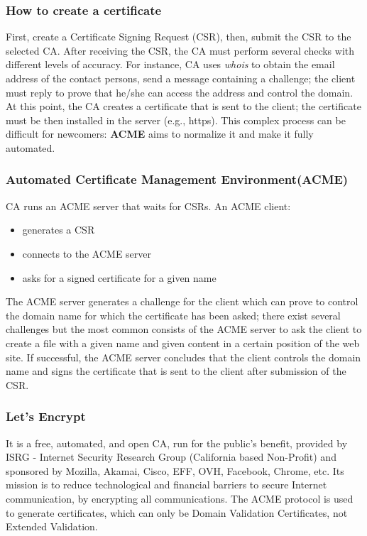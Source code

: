 \documentclass[a4paper, 10pt, titlepage]{article}
\begin{document}
\subsubsection{How to create a certificate}
First, create a Certificate Signing Request (CSR), then, submit the CSR to the selected CA. After receiving the CSR, the CA must perform several checks with different levels of accuracy. For instance, CA uses \textit{whois} to obtain the email address of the contact persons, send a message containing a challenge; the client must reply to prove that he/she can access the address and control the domain. At this point, the CA creates a certificate that is sent to the client; the certificate must be then installed in the server (e.g., https). This complex process can be difficult for newcomers: \textbf{ACME} aims to normalize it and make it fully automated.

\subsubsection{Automated Certificate Management Environment(ACME)}
CA runs an ACME server that waits for CSRs. An ACME client:
\begin{itemize}
\item generates a CSR
\item connects to the ACME server
\item asks for a signed certificate for a given name
\end{itemize}
The ACME server generates a challenge for the client which can prove to control the domain name for which the certificate has been asked; there exist several challenges but the most common consists of the ACME server to ask the client to create a file with a given name and given content in a certain position of the web site. If successful, the ACME server concludes that the client controls the domain name and signs the certificate that is sent to the client after submission of the CSR.

\subsubsection{Let's Encrypt}
It is a free, automated, and open CA, run for the public’s benefit, provided by ISRG - Internet Security Research Group (California based Non-Profit) and sponsored by Mozilla, Akamai, Cisco, EFF, OVH, Facebook, Chrome, etc. Its mission is to reduce technological and financial barriers to secure Internet communication, by encrypting all communications. The ACME protocol is used to generate certificates, which can only be Domain Validation Certificates, not Extended Validation. 
\end{document}
